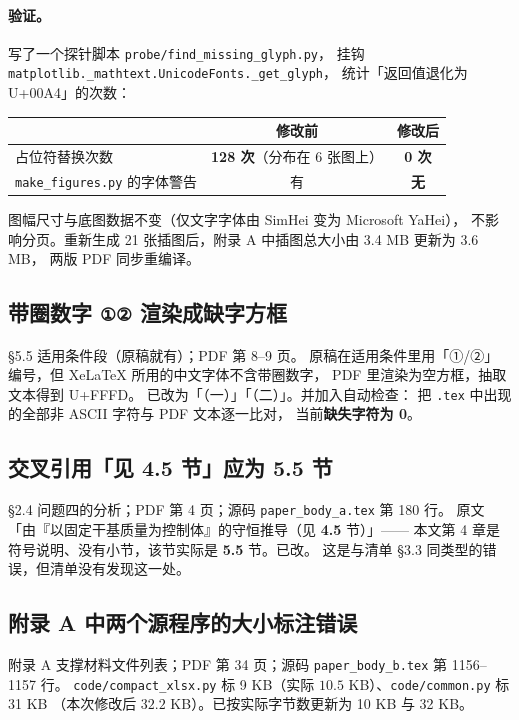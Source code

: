 \documentclass[11pt,a4paper]{ctexart}
\newcommand{\src}[1]{\texttt{#1}}
\newcommand{\loc}[1]{\textcolor{blue!60!black}{#1}}
\begin{document}
\paragraph{验证。}
写了一个探针脚本 \src{probe/find\_missing\_glyph.py}，
挂钩 \src{matplotlib.\_mathtext.UnicodeFonts.\_get\_glyph}，
统计「返回值退化为 U+00A4」的次数：

\begin{center}
\small
\begin{tabular}{@{}lcc@{}}
\toprule
 & 修改前 & 修改后 \\
\midrule
占位符替换次数 & \textbf{128 次}（分布在 6 张图上） & \textbf{0 次} \\
\src{make\_figures.py} 的字体警告 & 有 & \textbf{无} \\
\bottomrule
\end{tabular}
\end{center}

\noindent 图幅尺寸与底图数据不变（仅文字字体由 SimHei 变为 Microsoft YaHei），
不影响分页。重新生成 21 张插图后，附录 A 中插图总大小由 3.4 MB 更新为 3.6 MB，
两版 PDF 同步重编译。

\subsection{带圈数字 \texttt{①②} 渲染成缺字方框}

\loc{§5.5 适用条件段（原稿就有）；PDF 第 8--9 页}。
原稿在适用条件里用「①/②」编号，但 XeLaTeX 所用的中文字体不含带圈数字，
PDF 里渲染为空方框，抽取文本得到 U+FFFD。
已改为「（一）」「（二）」。并加入自动检查：
把 \src{.tex} 中出现的全部非 ASCII 字符与 PDF 文本逐一比对，
当前\textbf{缺失字符为 0}。

\subsection{交叉引用「见 4.5 节」应为 5.5 节}

\loc{§2.4 问题四的分析；PDF 第 4 页；源码 \src{paper\_body\_a.tex} 第 180 行}。
原文「由『以固定干基质量为控制体』的守恒推导（见 \textbf{4.5} 节）」——
本文第 4 章是符号说明、没有小节，该节实际是 \textbf{5.5} 节。已改。
这是与清单 §3.3 同类型的错误，但清单没有发现这一处。

\subsection{附录 A 中两个源程序的大小标注错误}

\loc{附录 A 支撑材料文件列表；PDF 第 34 页；源码 \src{paper\_body\_b.tex} 第 1156--1157 行}。
\src{code/compact\_xlsx.py} 标 9 KB（实际 $10.5$ KB）、\src{code/common.py} 标 31 KB
（本次修改后 $32.2$ KB）。已按实际字节数更新为 10 KB 与 32 KB。
\end{document}

